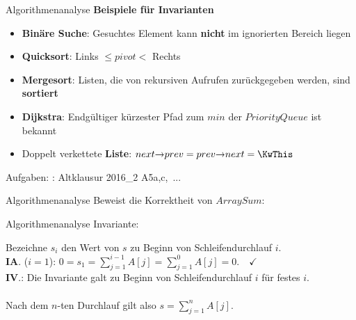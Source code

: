 \begin{frame}{Algorithmenanalyse}
	\textbf{Beispiele für Invarianten} \\
	\begin{itemize}
		\item \textbf{Binäre Suche}: Gesuchtes Element kann \textbf{nicht} im ignorierten Bereich liegen
		\item \textbf{Quicksort}: Links $\leq pivot < $ Rechts
		\item \textbf{Mergesort}: Listen, die von rekursiven Aufrufen zurückgegeben werden, sind \textbf{sortiert}
		\item \textbf{Dijkstra}: Endgültiger kürzester Pfad zum $min$ der $PriorityQueue$ ist bekannt
		\item Doppelt verkettete \textbf{Liste}: $next \access prev = prev \access next = \KwThis$
	\end{itemize}
	\bigskip
	\small
	Aufgaben: \ZB: Altklausur 2016\_2 A5a,c, \,...
\end{frame}

\begin{frame}{Algorithmenanalyse}
	Beweist die Korrektheit von $ArraySum$: 
	\begin{algorithm}[H]
	\end{algorithm}
\end{frame}

\begin{frame}{Algorithmenanalyse}
	\solutionheading
	\Impl Invariante: \\
	\begin{algorithm}[H]
	\end{algorithm}
	Bezeichne $s_i$ den Wert von $s$ zu Beginn von Schleifendurchlauf $i$. \\
	\hanging \textbf{IA}. ($i=1$): \quad $0 = s_1 = \sum\limits_{j=1}^{i-1} A[j] = \sum\limits_{j=1}^{0} A[j] = 0. \quad \checkmark$ \\
	\pause
	\hanging \textbf{IV}.: Die Invariante galt zu Beginn von Schleifendurchlauf $i$ für festes $i$. \\
	\pause
	 \\
	Nach dem $n$-ten Durchlauf gilt also $s = \sum\limits_{j=1}^{n} A[j]$.
\end{frame}

